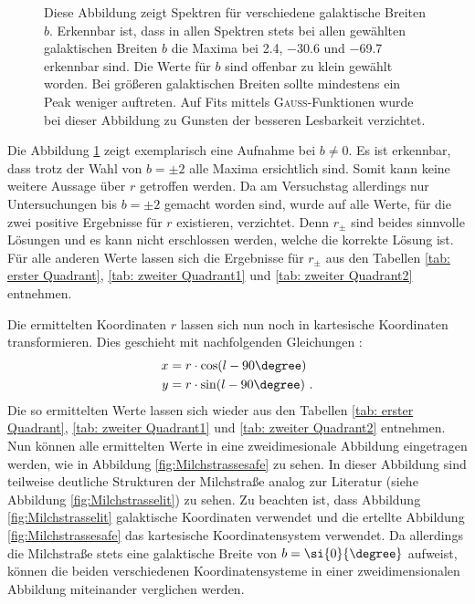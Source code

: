 \begin{figure}[H]
    \centering
       
    \caption[Spektren für verschiedene galaktische Breiten $b$]{Diese Abbildung zeigt Spektren für verschiedene galaktische Breiten $b$. Erkennbar ist, dass in allen Spektren stets bei allen gewählten galaktischen Breiten $b$ die Maxima bei \SI{2.4}{}, \SI{-30.6}{} und \SI{-69.7}{} erkennbar sind. Die Werte für $b$ sind offenbar zu klein gewählt worden. Bei größeren galaktischen Breiten sollte mindestens ein Peak weniger auftreten. Auf Fits mittels \textsc{Gauß}-Funktionen wurde bei dieser Abbildung zu Gunsten der besseren Lesbarkeit verzichtet.}
    \label{fig:bungleichnull}
\end{figure}

Die Abbildung \ref{fig:bungleichnull} zeigt exemplarisch eine Aufnahme bei $b \neq 0$. Es ist erkennbar, dass trotz der Wahl von $b = \pm 2$ alle Maxima ersichtlich sind. Somit kann keine weitere Aussage über $r$ getroffen werden. Da am Versuchstag allerdings nur Untersuchungen bis $b = \pm 2$ gemacht worden sind, wurde auf alle Werte, für die zwei positive Ergebnisse für $r$ existieren, verzichtet. Denn $r_{\pm}$ sind beides sinnvolle Lösungen und es kann nicht erschlossen werden, welche die korrekte Lösung ist. Für alle anderen Werte lassen sich die Ergebnisse für $r_{\pm}$ aus den Tabellen \ref{tab: erster Quadrant}, \ref{tab: zweiter Quadrant1} und \ref{tab: zweiter Quadrant2} entnehmen.

Die ermittelten Koordinaten $r$ lassen sich nun noch in kartesische Koordinaten transformieren. Dies geschieht mit nachfolgenden Gleichungen \cite{H1}:
\begin{align}
    x &= r \cdot \cos(l-90\degree) \\
    y &= r \cdot \sin(l-90\degree) \ .
    \label{eq:umrechnung}
\end{align}
Die so ermittelten Werte lassen sich wieder aus den Tabellen \ref{tab: erster Quadrant}, \ref{tab: zweiter Quadrant1} und \ref{tab: zweiter Quadrant2} entnehmen.\newline
Nun können alle ermittelten Werte in eine zweidimesionale Abbildung eingetragen werden, wie in Abbildung \ref{fig:Milchstrassesafe} zu sehen. In dieser Abbildung sind teilweise deutliche Strukturen der Milchstraße analog zur Literatur (siehe Abbildung \ref{fig:Milchstrasselit}) zu sehen.
Zu beachten ist, dass Abbildung \ref{fig:Milchstrasselit} galaktische Koordinaten verwendet und die ertellte Abbildung \ref{fig:Milchstrassesafe} das kartesische Koordinatensystem verwendet.
Da allerdings die Milchstraße stets eine galaktische Breite von $b= \si{0}{\degree}$ aufweist, können die beiden verschiedenen Koordinatensysteme in einer zweidimensionalen Abbildung miteinander verglichen werden.\newline

